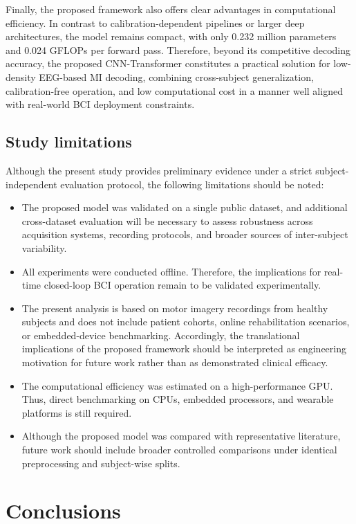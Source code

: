 \documentclass[a4paper,fleqn]{cas-dc}
\begin{document}
Finally, the proposed framework also offers clear advantages in computational efficiency. In contrast to calibration-dependent pipelines or larger deep architectures, the model remains compact, with only 0.232 million parameters and 0.024 GFLOPs per forward pass. Therefore, beyond its competitive decoding accuracy, the proposed CNN-Transformer constitutes a practical solution for low-density EEG-based MI decoding, combining cross-subject generalization, calibration-free operation, and low computational cost in a manner well aligned with real-world BCI deployment constraints.

\subsection{Study limitations}
Although the present study provides preliminary evidence under a strict subject-independent evaluation protocol, the following limitations should be noted:
\begin{itemize}  
    \item The proposed model was validated on a single public dataset, and additional cross-dataset evaluation will be necessary to assess robustness across acquisition systems, recording protocols, and broader sources of inter-subject variability.
    \item All experiments were conducted offline. Therefore, the implications for real-time closed-loop BCI operation remain to be validated experimentally.
    \item The present analysis is based on motor imagery recordings from healthy subjects and does not include patient cohorts, online rehabilitation scenarios, or embedded-device benchmarking. Accordingly, the translational implications of the proposed framework should be interpreted as engineering motivation for future work rather than as demonstrated clinical efficacy.
    \item The computational efficiency was estimated on a high-performance GPU. Thus, direct benchmarking on CPUs, embedded processors, and wearable platforms is still required. 
    \item  Although the proposed model was compared with representative literature, future work should include broader controlled comparisons under identical preprocessing and subject-wise splits.
\end{itemize}

\section{Conclusions}
\label{sec:conclusions}
\end{document}
